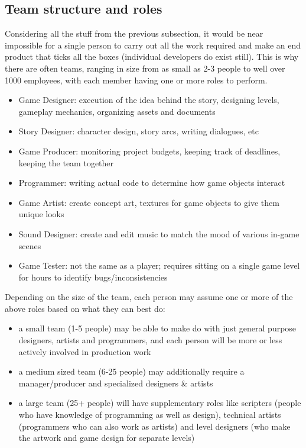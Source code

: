 \documentclass{article}[a4paper,12pt]
\theoremstyle{definition}
\begin{document}
\subsection{Team structure and roles}
Considering all the stuff from the previous subsection, it would be near impossible for a single person to carry out all the work required and make an end product that ticks all the boxes (individual developers do exist still). This is why there are often teams, ranging in size from as small as 2-3 people to well over 1000 employees, with each member having one or more roles to perform.
\begin{itemize}
	\item Game Designer: execution of the idea behind the story, designing levels, gameplay mechanics, organizing assets and documents
	\item Story Designer: character design, story arcs, writing dialogues, etc
	\item Game Producer: monitoring project budgets, keeping track of deadlines, keeping the team together
 	\item Programmer: writing actual code to determine how game objects interact
	\item Game Artist: create concept art, textures for game objects to give them unique looks 
	\item Sound Designer: create and edit music to match the mood of various in-game scenes
	\item Game Tester: not the same as a player; requires sitting on a single game level for hours to identify bugs/inconsistencies
\end{itemize}
Depending on the size of the team, each person may assume one or more of the above roles based on what they can best do:
\begin{itemize}
	\item a small team (1-5 people) may be able to make do with just general purpose designers, artists and programmers, and each person will be more or less actively involved in production work
	\item a medium sized team (6-25 people) may additionally require a manager/producer and specialized designers \& artists
	\item a large team (25+ people) will have supplementary roles like scripters (people who have knowledge of programming as well as design), technical artists (programmers who can also work as artists) and level designers (who make the artwork and game design for separate levels)
\end{itemize}
\hrulefill
\pagebreak
\end{document}
